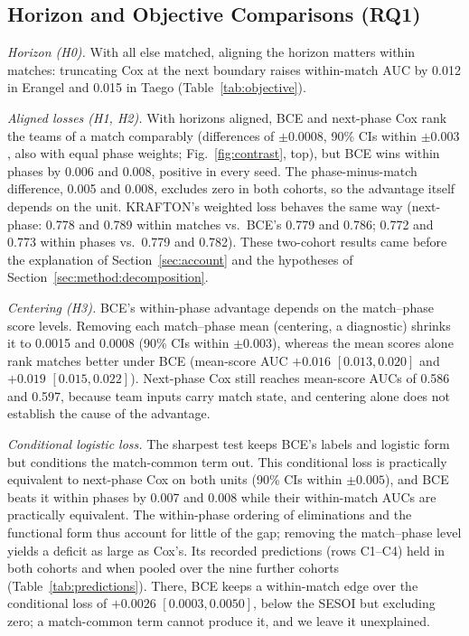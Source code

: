 \documentclass[sigconf,anonymous]{acmart}
\begin{document}
\subsection{Horizon and Objective Comparisons (RQ1)}
\label{sec:results:rq1}

\emph{Horizon (H0).} With all else matched, aligning the horizon matters within matches: truncating Cox at the next boundary raises within-match AUC by 0.012 in Erangel and 0.015 in Taego (Table~\ref{tab:objective}).

\emph{Aligned losses (H1, H2).} With horizons aligned, BCE and next-phase Cox rank the teams of a match comparably (differences of $\pm0.0008$, 90\% CIs within $\pm0.003$, also with equal phase weights; Fig.~\ref{fig:contrast}, top), but BCE wins within phases by 0.006 and 0.008, positive in every seed. The phase-minus-match difference, 0.005 and 0.008, excludes zero in both cohorts, so the advantage itself depends on the unit. KRAFTON's weighted loss behaves the same way (next-phase: 0.778 and 0.789 within matches vs.\ BCE's 0.779 and 0.786; 0.772 and 0.773 within phases vs.\ 0.779 and 0.782). These two-cohort results came before the explanation of Section~\ref{sec:account} and the hypotheses of Section~\ref{sec:method:decomposition}.

\emph{Centering (H3).} BCE's within-phase advantage depends on the match--phase score levels. Removing each match--phase mean (centering, a diagnostic) shrinks it to 0.0015 and 0.0008 (90\% CIs within $\pm0.003$), whereas the mean scores alone rank matches better under BCE (mean-score AUC $+0.016$ $[0.013,\allowbreak 0.020]$ and $+0.019$ $[0.015,\allowbreak 0.022]$). Next-phase Cox still reaches mean-score AUCs of 0.586 and 0.597, because team inputs carry match state, and centering alone does not establish the cause of the advantage.

\emph{Conditional logistic loss.} The sharpest test keeps BCE's labels and logistic form but conditions the match-common term out. This conditional loss is practically equivalent to next-phase Cox on both units (90\% CIs within $\pm0.005$), and BCE beats it within phases by 0.007 and 0.008 while their within-match AUCs are practically equivalent. The within-phase ordering of eliminations and the functional form thus account for little of the gap; removing the match--phase level yields a deficit as large as Cox's. Its recorded predictions (rows C1--C4) held in both cohorts and when pooled over the nine further cohorts (Table~\ref{tab:predictions}). There, BCE keeps a within-match edge over the conditional loss of $+0.0026$ $[0.0003,\allowbreak 0.0050]$, below the SESOI but excluding zero; a match-common term cannot produce it, and we leave it unexplained.
\end{document}
